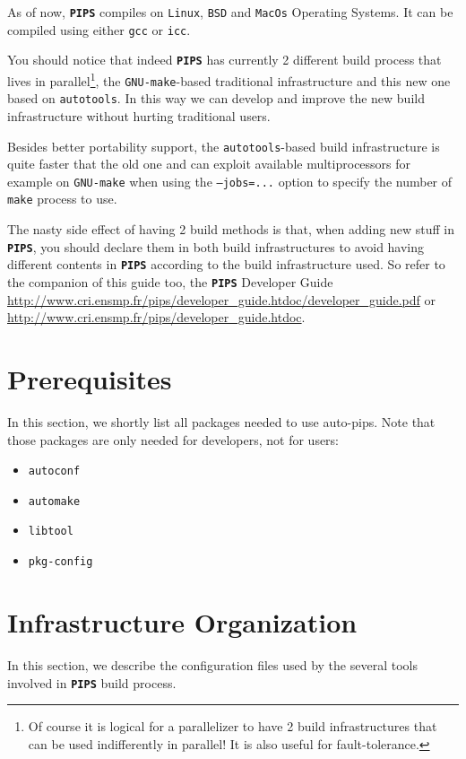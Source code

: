 \documentclass[a4paper]{article}
\newcommand{\PIPS}{\textbf{\texttt{PIPS}}}
\newcommand{\PipsDevGuidePDF}{\url{http://www.cri.ensmp.fr/pips/developer_guide.htdoc/developer_guide.pdf}\xspace}
\newcommand{\PipsDevGuideHTDOC}{\url{http://www.cri.ensmp.fr/pips/developer_guide.htdoc}\xspace}
\begin{document}
As of now, \PIPS{} compiles on  \texttt{Linux}, \texttt{BSD} and \texttt{MacOs} Operating Systems.
It can be compiled using either \texttt{gcc} or \texttt{icc}.

You should notice that indeed \PIPS{} has currently 2 different build
process that lives in parallel\footnote{Of course it is logical for a
  parallelizer to have 2 build infrastructures that can be used
  indifferently in parallel! \smiley{} It is also useful for
  fault-tolerance.}, the \texttt{GNU-make}-based traditional infrastructure
and this new one based on \texttt{autotools}. In this way we can develop
and improve the new build infrastructure without hurting traditional
users.

Besides better portability support, the \texttt{autotools}-based build
infrastructure is quite faster that the old one and can exploit available
multiprocessors for example on \texttt{GNU-make} when using the
\texttt{--jobs=...} option to specify the number of \texttt{make} process
to use.

The nasty side effect of having 2 build methods is that, when adding new
stuff in \PIPS{}, you should declare them in both build infrastructures to
avoid having different contents in \PIPS{} according to the build
infrastructure used. So refer to the companion of this guide too, the
\PIPS{} Developer Guide \PipsDevGuidePDF or \PipsDevGuideHTDOC.

\section{Prerequisites}

In this section, we shortly list all packages needed to use auto-pips.
Note that those packages are only needed for developers, not for users:
\begin{itemize}
\item \texttt{autoconf}
\item \texttt{automake}
\item \texttt{libtool}
\item \texttt{pkg-config}
\end{itemize}

\section{Infrastructure Organization}
\label{sec:structure}

In this section, we describe the configuration files used by the several tools involved in \PIPS{} build process.
\end{document}
